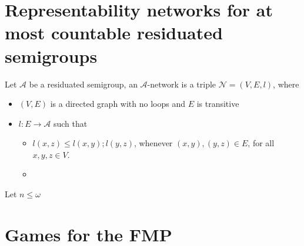 \documentclass[a4paper]{article}
\theoremstyle{defin}
\theoremstyle{theorem}
\theoremstyle{claim}
\theoremstyle{prop}
\theoremstyle{lemma}
\theoremstyle{fact}
\theoremstyle{ex}
\theoremstyle{col}
\begin{document}
\section{Representability networks for at most countable residuated semigroups}

Let $\mathcal{A}$ be a residuated semigroup, an $\mathcal{A}$-network is a triple $\mathcal{N} = (V, E, l)$, where
\begin{itemize}
\item $(V, E)$ is a directed graph with no loops and $E$ is transitive
\item $l : E \to \mathcal{A}$ such that
\begin{itemize}
\item $l(x, z) \leq l(x, y) ; l(y,z)$, whenever $(x, y), (y, z) \in E$, for all $x, y, z \in V$.
\item 
\end{itemize}
\end{itemize}

Let $n \leq \omega$

\section{Games for the FMP}



\end{document}
